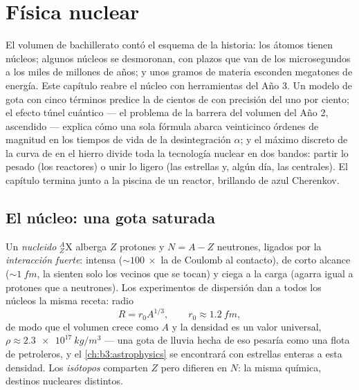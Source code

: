 \chapter{Física nuclear}\label{ch:b3:nuclear-physics}


El volumen de bachillerato contó el esquema de la historia: los átomos tienen núcleos;
algunos núcleos se desmoronan, con plazos que van de los microsegundos a los
miles de millones de años; y unos gramos de materia esconden megatones de energía. Este
capítulo reabre el núcleo con herramientas del Año 3. Un modelo de gota con
cinco términos predice la  de cientos de  con precisión del uno por
ciento; el efecto túnel cuántico --- el problema de la barrera del volumen del Año 2,
ascendido --- explica cómo una sola fórmula abarca veinticinco órdenes de
magnitud en los tiempos de vida de la desintegración $\alpha$; y el máximo discreto de
la curva de  en el hierro divide toda la tecnología nuclear en dos
bandos: partir lo pesado (los reactores) o unir lo ligero (las estrellas y,
algún día, las centrales). El capítulo termina junto a la piscina de un reactor,
brillando de azul Cherenkov.

\section{El núcleo: una gota saturada}

\begin{definition}\label{def:b3:nuclear-physics:nuclide}
Un \emph{nucleido} $^{A}_{Z}\text{X}$ alberga $Z$ protones y $N = A -
Z$ neutrones, ligados por la \emph{interacción fuerte}: intensa
(${\sim}\qty{100}{}\times$ la de Coulomb al contacto), de corto alcance
(${\sim}\qty{1}{fm}$, la sienten solo los vecinos que se tocan) y ciega
a la carga (agarra igual a protones que a neutrones). Los experimentos
de dispersión dan a todos los núcleos la misma receta: radio
\[
R = r_0A^{1/3} , \qquad r_0 \approx \qty{1.2}{fm} ,
\]
de modo que el volumen crece como $A$ y la densidad es un valor universal,
$\rho \approx \qty{2.3e17}{kg/m^3}$ --- una gota de lluvia hecha de eso
pesaría como una flota de petroleros, y el
\cref{ch:b3:astrophysics} se encontrará con estrellas enteras a esta densidad.
Los \emph{isótopos} comparten $Z$ pero difieren en $N$: la misma química,
destinos nucleares distintos.
\end{definition}

